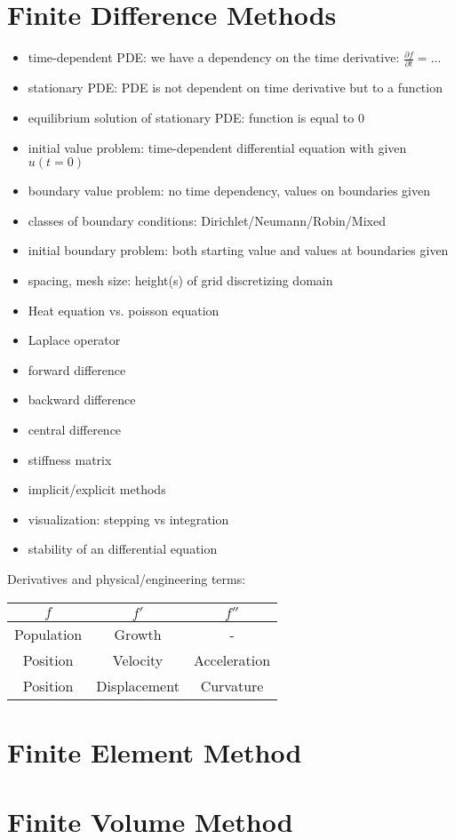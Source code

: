 \section{Finite Difference Methods}

\begin{itemize}
	\item time-dependent PDE: we have a dependency on the time derivative: $\frac{\partial f}{\partial t} = ...$
	\item stationary PDE: PDE is not dependent on time derivative but to a function 
	\item equilibrium solution of stationary PDE: function is equal to 0
	\item initial value problem: time-dependent differential equation with given $u(t=0)$
	\item boundary value problem: no time dependency, values on boundaries given
	\item classes of boundary conditions: Dirichlet/Neumann/Robin/Mixed
	\item initial boundary problem: both starting value and values at boundaries given
	\item spacing, mesh size: height(s) of grid discretizing domain
	\item Heat equation vs. poisson equation
	\item Laplace operator
\end{itemize}

\begin{itemize}
	\item forward difference
	\item backward difference
	\item central difference 
	\item stiffness matrix
	\item implicit/explicit methods
	\item visualization: stepping vs integration
	\item stability of an differential equation
\end{itemize}

Derivatives and physical/engineering  terms: 

\begin{tabular}{c|c|c}
	$f$ & $f'$ & $f''$ \\
	\hline
	Population & Growth & - \\ 
	\hline
	Position & Velocity & Acceleration \\
	\hline
	Position & Displacement & Curvature
\end{tabular}

\section{Finite Element Method}

\section{Finite Volume Method}


